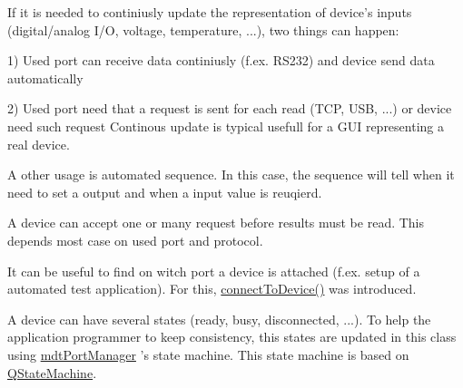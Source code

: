 If it is needed to continiusly update the representation of device's inputs (digital/analog I/\-O, voltage, temperature, ...), two things can happen\-:
\begin{DoxyItemize}
\item 1) Used port can receive data continiusly (f.\-ex. R\-S232) and device send data automatically
\item 2) Used port need that a request is sent for each read (T\-C\-P, U\-S\-B, ...) or device need such request Continous update is typical usefull for a G\-U\-I representing a real device.
\end{DoxyItemize}

A other usage is automated sequence. In this case, the sequence will tell when it need to set a output and when a input value is reuqierd.

A device can accept one or many request before results must be read. This depends most case on used port and protocol.

It can be useful to find on witch port a device is attached (f.\-ex. setup of a automated test application). For this, \hyperlink{classmdt_device_abab1b6e45af527880ce469ae318474c0}{connect\-To\-Device()} was introduced.

A device can have several states (ready, busy, disconnected, ...). To help the application programmer to keep consistency, this states are updated in this class using \hyperlink{classmdt_port_manager}{mdt\-Port\-Manager} 's state machine. This state machine is based on \hyperlink{class_q_state_machine}{Q\-State\-Machine}.

